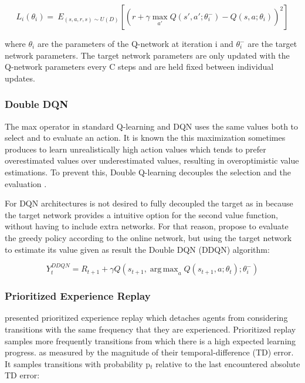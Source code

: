 \documentclass{llncs}
\DeclareMathOperator*{\argmax}{arg\,max}
\begin{document}
\begin{equation}
L_{i}(\theta_{i}) = \ E_{(s,a,r,s) \sim U(D)} \left[ \left(r + \gamma \max_{a'}Q\left(s',a';\theta_{i}^{-}\right) - Q\left(s,a;\theta_{i}\right)\right)^{2} \right]
\end{equation}

where $\theta_{i}$ are the parameters of the Q-network at iteration i and $\theta_{i}^{-}$ are the target network parameters. The target network parameters are only updated with the Q-network parameters every C steps and are held fixed between individual updates.

\subsubsection{Double DQN}

	The max operator in standard Q-learning and DQN uses the same values both to select and to evaluate an action. It is known the this maximization sometimes produces to learn unrealistically high action values which tends to prefer overestimated values over underestimated values, resulting in overoptimistic value estimations. To prevent this, Double Q-learning decouples the selection and the evaluation \cite{Hasselt2010}.
	
	For DQN architectures is not desired to fully decoupled the target  as in \cite{Hasselt2010} because the target network provides a intuitive option for the second value function, without having to include extra networks. For that reason, \cite{Hasselt:2016:DRL:3016100.3016191} propose to evaluate the greedy policy according to the online network, but using the target network to estimate its value given as result the Double DQN (DDQN) algorithm:
	
\begin{equation}
Y_{t}^{DDQN} = R_{t+1} + \gamma Q(s_{t+1}, \argmax_{a} Q(s_{t+1}, a;\theta_{t});\theta_{i}^{-})
\end{equation}

\subsubsection{Prioritized Experience Replay}

\cite{SchaulQAS15} presented prioritized experience replay which detaches agents from considering transitions with the same frequency that they are experienced. Prioritized replay samples more frequently transitions from which there is a high expected learning progress. as measured by the magnitude of their temporal-difference (TD) error. It samples transitions with probability p$_{t}$ relative to the last encountered absolute TD error:
	
\end{document}
